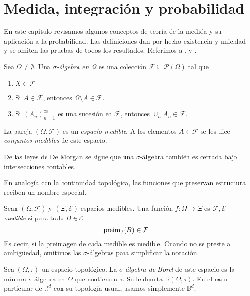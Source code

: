 \documentclass[main.tex]{subfiles}
\begin{document}
\chapter{Medida, integración y probabilidad}

En este capítulo revisamos algunos conceptos de teoría de la medida y su aplicación a la probabilidad. Las definiciones dan por hecho existencia y unicidad y se omiten las pruebas de todos los resultados. Referimos a \cite{halmos1949}, \cite{durrett} y \cite{ash}.
\begin{definition}
Sea $\Omega\neq\emptyset$. Una \textit{$\sigma$-álgebra en $\Omega$} es una colección $\mathcal{F}\subseteq\mathcal{P}(\Omega)$ tal que
\begin{enumerate}[label=\roman*.]
	\item $X \in \mathcal{F}$
	\item Si $A\in\mathcal{F}$, entonces $\Omega\setminus A \in \mathcal{F}$.
	\item Si $(A_n)_{n=1}^\infty$ es una sucesión en $\mathcal{F}$, entonces $\cup_nA_n\in \mathcal{F}$.
\end{enumerate}
La pareja $(\Omega, \mathcal{F})$ es un \textit{espacio medible}. A los elementos $A\in\mathcal{F}$ se les dice \textit{conjuntos medibles} de este espacio.
\end{definition}

De las leyes de De Morgan se sigue que una $\sigma$-álgebra también es cerrada bajo intersecciones contables. 

En analogía con la continuidad topológica, las funciones que preservan estructura reciben un nombre especial.

\begin{definition}
Sean $(\Omega, \mathcal{F})$ y $(\Xi, \mathcal{E})$ espacios medibles. Una función $f: \Omega \to \Xi$ es $\mathcal{F,E}$\textit{-medible} si para todo $B\in\mathcal{E}$
\begin{equation*}
\operatorname{preim}_f(B)\in\mathcal{F}	
\end{equation*}
Es decir, si la preimagen de cada medible es medible. Cuando no se preste a ambigüedad, omitimos las $\sigma$-álgebras para simplificar la notación.
\end{definition}

\begin{definition}
Sea $(\Omega, \tau)$ un espacio topológico. La $\sigma$\textit{-álgebra de Borel} de este espacio es la mínima $\sigma$-álgebra en $\Omega$ que contiene a $\tau$. Se le denota $\mathbb{B}(\Omega, \tau)$.
En el caso particular de $\mathbb{R}^d$ con su topología usual, usamos simplemente $\mathbb{B}^d$.
\end{definition}
\end{document}
